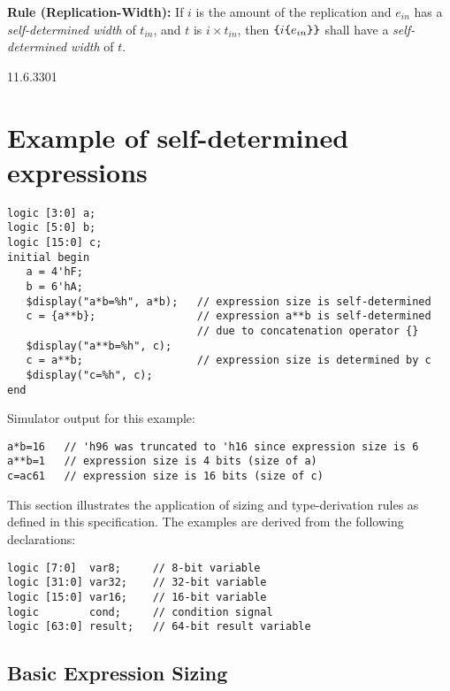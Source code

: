 \documentclass{article}
\newcommand{\sds}{\emph{self-determined width}}
\newenvironment{typingrule}[1]%
{\par\noindent\textbf{Rule (#1):} }%
{\par}
\begin{document}
\begin{typingrule}{Replication-Width}
  If $i$ is the amount of the replication and $e_{in}$ has a
  \sds{} of $t_{in}$, and $t$ is $i \times t_{in}$, then
  $\verb|{| i \verb|{| e_{in}\verb|}}|$ shall have a
  \sds{} of $t$.
\end{typingrule}

\begin{lrmquote}{11.6.3}{301}

  \section{Example of self-determined expressions}
  \label{examples}

  {
    \color{red}
    \begin{verbatim}
logic [3:0] a;
logic [5:0] b;
logic [15:0] c;
initial begin
   a = 4'hF;
   b = 6'hA;
   $display("a*b=%h", a*b);   // expression size is self-determined
   c = {a**b};                // expression a**b is self-determined
                              // due to concatenation operator {}
   $display("a**b=%h", c);
   c = a**b;                  // expression size is determined by c
   $display("c=%h", c);
end
\end{verbatim}

    Simulator output for this example:
    \begin{verbatim}
a*b=16   // 'h96 was truncated to 'h16 since expression size is 6
a**b=1   // expression size is 4 bits (size of a)
c=ac61   // expression size is 16 bits (size of c)
\end{verbatim}

  }
\end{lrmquote}

This section illustrates the application of sizing and type-derivation
rules as defined in this specification. The examples are derived from
the following declarations:

\begin{verbatim}
logic [7:0]  var8;     // 8-bit variable
logic [31:0] var32;    // 32-bit variable
logic [15:0] var16;    // 16-bit variable
logic        cond;     // condition signal
logic [63:0] result;   // 64-bit result variable
\end{verbatim}

\subsection{Basic Expression Sizing}
\end{document}
